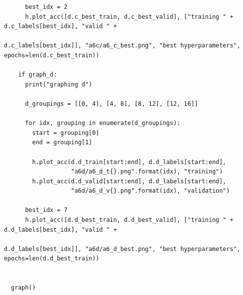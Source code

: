 \documentclass{article}
\newcommand{\1}{\mathbf{1}}
\begin{document}
{\begin{verbatim}
      best_idx = 2
      h.plot_acc([d.c_best_train, d.c_best_valid], ["training " + d.c_labels[best_idx], "valid " +
                                                    d.c_labels[best_idx]], "a6c/a6_c_best.png", "best hyperparameters", epochs=len(d.c_best_train))
  
    if graph_d:
      print("graphing d")
  
      d_groupings = [[0, 4], [4, 8], [8, 12], [12, 16]]
  
      for idx, grouping in enumerate(d_groupings):
        start = grouping[0]
        end = grouping[1]
  
        h.plot_acc(d.d_train[start:end], d.d_labels[start:end],
                   "a6d/a6_d_t{}.png".format(idx), "training")
        h.plot_acc(d.d_valid[start:end], d.d_labels[start:end],
                   "a6d/a6_d_v{}.png".format(idx), "validation")
  
      best_idx = 7
      h.plot_acc([d.d_best_train, d.d_best_valid], ["training " + d.d_labels[best_idx], "valid " +
                                                    d.d_labels[best_idx]], "a6d/a6_d_best.png", "best hyperparameters", epochs=len(d.d_best_train))
  
  
  graph()
    
\end{verbatim}

}
\end{document}
